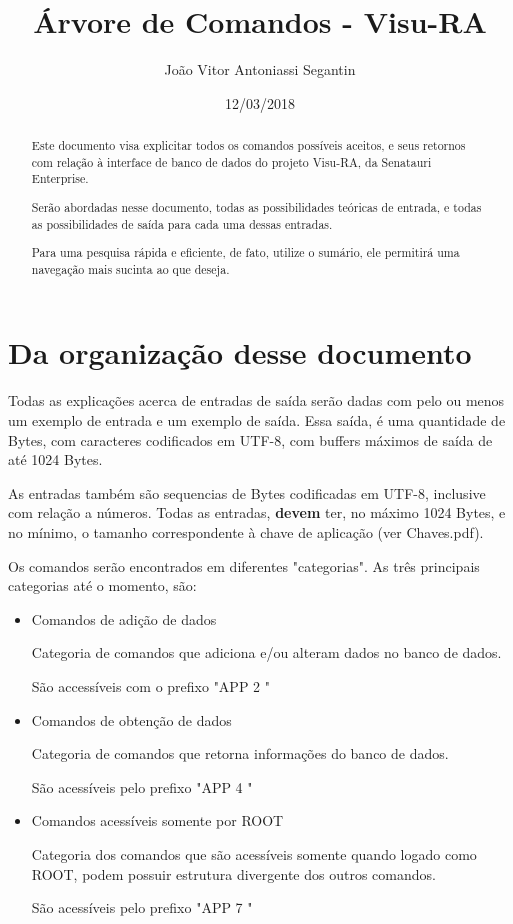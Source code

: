 \documentclass{article}
\author{João Vitor Antoniassi Segantin}
\date{12/03/2018}
\title{Árvore de Comandos - Visu-RA}
\begin{document}
	\maketitle
	\begin{abstract}\indent
		\par Este documento visa explicitar todos os comandos possíveis aceitos, e seus retornos com relação à interface de banco de dados do projeto Visu-RA, da Senatauri Enterprise.
		\par Serão abordadas nesse documento, todas as possibilidades teóricas de entrada, e todas as possibilidades de saída para cada uma dessas entradas.
		\par Para uma pesquisa rápida e eficiente, de fato, utilize o sumário, ele permitirá uma navegação mais sucinta ao que deseja.
	\end{abstract}
	\tableofcontents
	\newpage
	\section{Da organização desse documento}\indent
		\par Todas as explicações acerca de entradas de saída serão dadas com pelo ou menos um exemplo de entrada e um exemplo de saída. Essa saída, é uma quantidade de Bytes, com caracteres codificados em UTF-8, com buffers máximos de saída de até 1024 Bytes.
		\par As entradas também são sequencias de Bytes codificadas em UTF-8, inclusive com relação a números. Todas as entradas, \textbf{devem} ter, no máximo 1024 Bytes, e no mínimo, o tamanho correspondente à chave de aplicação (ver Chaves.pdf).
		\par Os comandos serão encontrados em diferentes "categorias". As três principais categorias até o momento, são:
		\begin{itemize}
			\item{Comandos de adição de dados}
				\par Categoria de comandos que adiciona e/ou alteram dados no banco de dados.
				\par São accessíveis com o prefixo "APP 2 "
			\item{Comandos de obtenção de dados}
				\par Categoria de comandos que retorna informações do banco de dados.
				\par São acessíveis pelo prefixo "APP 4 "
			\item{Comandos acessíveis somente por ROOT}
				\par Categoria dos comandos que são acessíveis somente quando logado como ROOT, podem possuir estrutura divergente dos outros comandos.
				\par São acessíveis pelo prefixo "APP 7 "
		\end{itemize}
\end{document}
